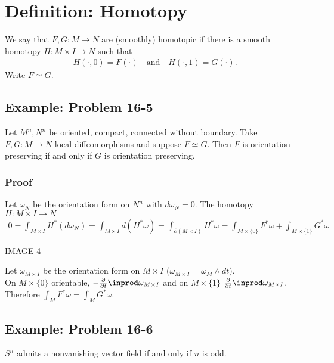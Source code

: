 \documentclass[11pt]{article}
\begin{document}
\section*{Definition: Homotopy}
\label{sec:orgdee9821}
We say that \(F,G:M\to N\) are (smoothly) homotopic if there is a smooth homotopy \(H:M\times I\to N\) such that\\
\begin{align*}
  H(\cdot,0) =F(\cdot) \quad\text{and}\quad H(\cdot, 1)=G(\cdot).
\end{align*}
Write \(F\simeq G\).\\
\subsection*{Example: Problem 16-5}
\label{sec:orge84604c}
Let \(M^{n},N^{n}\) be oriented, compact, connected without boundary. Take \(F,G:M\to N\) local diffeomorphisms and suppose \(F\simeq G\). Then \(F\) is orientation preserving if and only if \(G\) is orientation preserving.\\
\subsubsection*{Proof}
\label{sec:org08bb350}
Let \(\omega_{N}\) be the orientation form on \(N^{n}\) with \(d\omega_{N}=0\). The homotopy \(H:M\times I\to N\)\\
\begin{align*}
  0
  =\int_{M\times I}H^{*}(d\omega_{N})
  =\int_{M\times I}d(H^{*}\omega)
  =\int_{\partial (M\times I)}H^{*}\omega
  =\int_{M\times\{0\}}F^{*}\omega+\int_{M\times\{1\}}G^{*}\omega
\end{align*}
\begin{center}
IMAGE 4\\
\end{center}
Let \(\omega_{M\times I}\) be the orientation form on \(M\times I\) (\(\omega_{M\times I}=\omega_{M}\wedge dt\)).\\
On \(M\times\{0\}\) orientable, \(-\frac{\partial}{\partial t}\inprod\omega_{M\times I}\) and on \(M\times\{1\}\) \(\frac{\partial}{\partial t}\inprod\omega_{M\times I}\). Therefore \(\int_{M}F^{*}\omega=\int_{M}G^{*}\omega\).\\
\subsection*{Example: Problem 16-6}
\label{sec:orgada56b4}
\(S^{n}\) admits a nonvanishing vector field if and only if \(n\) is odd.\\
\end{document}
